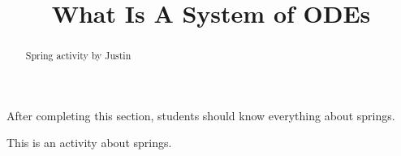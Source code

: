 \documentclass{ximera}
\title{What Is A System of ODEs}
\begin{document}
\begin{abstract}
Spring activity by Justin
\end{abstract}

\begin{sectionOutcomes}
After completing this section, students should know everything about springs.

\end{sectionOutcomes}


\maketitle

This is an activity about springs.
\end{document}
